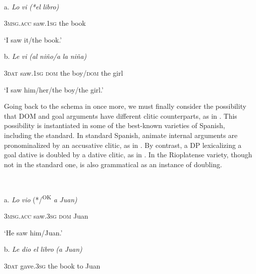 \documentclass[output=paper]{langscibook}
\begin{document}
\ea\label{ex:manzini:}
{}\\
\z

a.   \textit{Lo}     \textit{vi}     \textit{(*el} \textit{libro)}



\textsc{3msg.acc}  saw.\textsc{1sg}  the book


‘I saw it/the book.’


   b.   \textit{Le}   \textit{vi}     \textit{(al} \textit{niño/a} \textit{la} \textit{niña)}



\textsc{3dat}  saw.\textsc{1sg}  \textsc{dom} the boy/\textsc{dom} the girl


‘I saw him/her/the boy/the girl.’

Going back to the schema in  once more, we must finally consider the possibility that DOM and goal arguments have different clitic counterparts, as in . This possibility is instantiated in some of the best-known varieties of Spanish, including the standard. In standard Spanish, animate internal arguments are pronominalized by an accusative clitic, as in . By contrast, a DP lexicalizing a goal dative is doubled by a dative clitic, as in . In the Rioplatense variety, though not in the standard one,  is also grammatical as an instance of doubling.

\ea\label{ex:manzini:}
{}\\
\z

a.  \textit{Lo}     \textit{vio}    (*/\textsuperscript{OK}\textit{\textsuperscript{} }\textit{a} \textit{Juan)} 



  \textsc{3msg.acc}  saw.\textsc{3sg}  \textsc{dom} Juan


  ‘He saw him/Juan.’


  b.  \textit{Le}   \textit{dio}     \textit{el} \textit{libro}   \textit{(a} \textit{Juan)}



  \textsc{3dat}   gave.\textsc{3sg}  the book   to Juan
\end{document}
